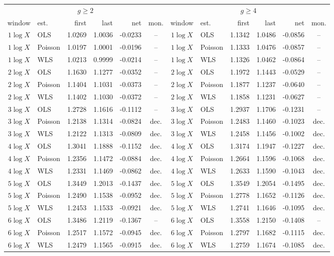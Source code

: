 \begin{tabular}{@{}cl rrr c@{\qquad} cl rrr c@{}}
\toprule
\multicolumn{6}{c}{$g \geq 2$} & \multicolumn{6}{c}{$g \geq 4$} \\
\cmidrule(r){1-6}\cmidrule(l){7-12}
window & est. & first & last & net & mon. & window & est. & first & last & net & mon. \\
\midrule
$1\log X$ & OLS & 1.0269 & 1.0036 & -0.0233 & -- & $1\log X$ & OLS & 1.1342 & 1.0486 & -0.0856 & -- \\
$1\log X$ & Poisson & 1.0197 & 1.0001 & -0.0196 & -- & $1\log X$ & Poisson & 1.1333 & 1.0476 & -0.0857 & -- \\
$1\log X$ & WLS & 1.0213 & 0.9999 & -0.0214 & -- & $1\log X$ & WLS & 1.1326 & 1.0462 & -0.0864 & -- \\
$2\log X$ & OLS & 1.1630 & 1.1277 & -0.0352 & -- & $2\log X$ & OLS & 1.1972 & 1.1443 & -0.0529 & -- \\
$2\log X$ & Poisson & 1.1404 & 1.1031 & -0.0373 & -- & $2\log X$ & Poisson & 1.1877 & 1.1237 & -0.0640 & -- \\
$2\log X$ & WLS & 1.1402 & 1.1030 & -0.0372 & -- & $2\log X$ & WLS & 1.1858 & 1.1231 & -0.0627 & -- \\
$3\log X$ & OLS & 1.2728 & 1.1616 & -0.1112 & -- & $3\log X$ & OLS & 1.2937 & 1.1706 & -0.1231 & -- \\
$3\log X$ & Poisson & 1.2138 & 1.1314 & -0.0824 & dec. & $3\log X$ & Poisson & 1.2483 & 1.1460 & -0.1023 & dec. \\
$3\log X$ & WLS & 1.2122 & 1.1313 & -0.0809 & dec. & $3\log X$ & WLS & 1.2458 & 1.1456 & -0.1002 & dec. \\
$4\log X$ & OLS & 1.3041 & 1.1888 & -0.1152 & dec. & $4\log X$ & OLS & 1.3174 & 1.1947 & -0.1227 & dec. \\
$4\log X$ & Poisson & 1.2356 & 1.1472 & -0.0884 & dec. & $4\log X$ & Poisson & 1.2664 & 1.1596 & -0.1068 & dec. \\
$4\log X$ & WLS & 1.2331 & 1.1469 & -0.0862 & dec. & $4\log X$ & WLS & 1.2633 & 1.1590 & -0.1043 & dec. \\
$5\log X$ & OLS & 1.3449 & 1.2013 & -0.1437 & dec. & $5\log X$ & OLS & 1.3549 & 1.2054 & -0.1495 & dec. \\
$5\log X$ & Poisson & 1.2490 & 1.1538 & -0.0952 & dec. & $5\log X$ & Poisson & 1.2778 & 1.1652 & -0.1126 & dec. \\
$5\log X$ & WLS & 1.2453 & 1.1533 & -0.0921 & dec. & $5\log X$ & WLS & 1.2741 & 1.1646 & -0.1095 & dec. \\
$6\log X$ & OLS & 1.3486 & 1.2119 & -0.1367 & -- & $6\log X$ & OLS & 1.3558 & 1.2150 & -0.1408 & -- \\
$6\log X$ & Poisson & 1.2517 & 1.1572 & -0.0945 & dec. & $6\log X$ & Poisson & 1.2797 & 1.1682 & -0.1115 & dec. \\
$6\log X$ & WLS & 1.2479 & 1.1565 & -0.0915 & dec. & $6\log X$ & WLS & 1.2759 & 1.1674 & -0.1085 & dec. \\
\bottomrule
\end{tabular}